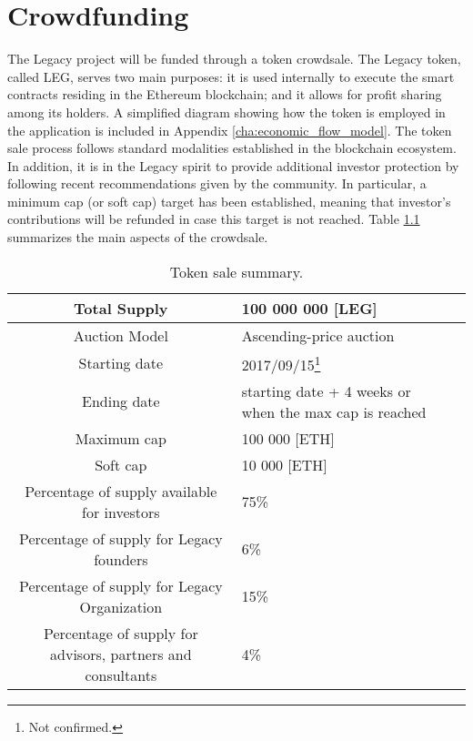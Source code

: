 \chapter{Crowdfunding} %
\label{cha:crowdfunding}

The Legacy project will be funded through a token crowdsale. The Legacy token, called LEG, serves two main purposes: it is used internally to execute the smart contracts residing in the Ethereum blockchain; and it allows for profit sharing among its holders. A simplified diagram showing how the token is employed in the application is included in Appendix \ref{cha:economic_flow_model}. The token sale process follows standard modalities established in the blockchain ecosystem. In addition, it is in the Legacy spirit to provide additional investor protection by following recent recommendations given by the community. In particular, a minimum cap (or soft cap) target has been established, meaning that investor’s contributions will be refunded in case this target is not reached. Table \ref{table:ico_summary} summarizes the main aspects of the crowdsale.

\begin{table}[h]
	\begin{center}		
		{\renewcommand{\arraystretch}{1.3}			
			\begin{tabular}{| c | p{5cm} | p{3.5cm}  |}	
		    \hline	
		    	Total Supply		&  100 000 000 [LEG]  \\ \hline
		    	Auction Model       &  Ascending-price auction \\ \hline
				Starting date       &  2017/09/15\footnote{Not confirmed.} \\ \hline
				Ending date         &  starting date + 4 weeks or when the max cap is reached \\ \hline
				Maximum cap         &  100 000 [ETH] \\ \hline
				Soft cap            &  10 000 [ETH] \\ \hline
				Percentage of supply available for investors & 75\% \\ \hline
				Percentage of supply for Legacy founders     &  6\% \\ \hline
				Percentage of supply for Legacy Organization & 15\% \\ \hline
				Percentage of supply for advisors, partners and consultants & 4\% \\
			\hline	
			\end{tabular}				
		}
	\caption{Token sale summary.}
	\label{table:ico_summary}		
	\end{center}
\end{table}


